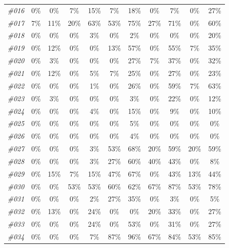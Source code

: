 \begin{table}[t]
\begin{tabular}{ccccccccccc}
    \textit{\#016} & 0\%   & 0\%   & 7\%   & 15\%  & 7\%   & 18\%  & 0\%   & 7\%   & 0\%   & 27\% \\
    \textit{\#017} & 7\%   & 11\%  & 20\%  & 63\%  & 53\%  & 75\%  & 27\%  & 71\%  & 0\%   & 60\% \\
    \textit{\#018} & 0\%   & 0\%   & 0\%   & 3\%   & 0\%   & 2\%   & 0\%   & 0\%   & 0\%   & 20\% \\
    \textit{\#019} & 0\%   & 12\%  & 0\%   & 0\%   & 13\%  & 57\%  & 0\%   & 55\%  & 7\%   & 35\% \\
    \textit{\#020} & 0\%   & 3\%   & 0\%   & 0\%   & 0\%   & 27\%  & 7\%   & 37\%  & 0\%   & 32\% \\
    \textit{\#021} & 0\%   & 12\%  & 0\%   & 5\%   & 7\%   & 25\%  & 0\%   & 27\%  & 0\%   & 23\% \\
    \textit{\#022} & 0\%   & 0\%   & 0\%   & 1\%   & 0\%   & 26\%  & 0\%   & 59\%  & 7\%   & 63\% \\
    \textit{\#023} & 0\%   & 3\%   & 0\%   & 0\%   & 0\%   & 3\%   & 0\%   & 22\%  & 0\%   & 12\% \\
    \textit{\#024} & 0\%   & 0\%   & 0\%   & 4\%   & 0\%   & 15\%  & 0\%   & 9\%   & 0\%   & 10\% \\
    \textit{\#025} & 0\%   & 0\%   & 0\%   & 0\%   & 0\%   & 5\%   & 0\%   & 0\%   & 0\%   & 0\% \\
    \textit{\#026} & 0\%   & 0\%   & 0\%   & 0\%   & 0\%   & 4\%   & 0\%   & 0\%   & 0\%   & 0\% \\
    \textit{\#027} & 0\%   & 0\%   & 0\%   & 3\%   & 53\%  & 68\%  & 20\%  & 59\%  & 20\%  & 59\% \\
    \textit{\#028} & 0\%   & 0\%   & 0\%   & 3\%   & 27\%  & 60\%  & 40\%  & 43\%  & 0\%   & 8\% \\
    \textit{\#029} & 0\%   & 15\%  & 7\%   & 15\%  & 47\%  & 67\%  & 0\%   & 43\%  & 13\%  & 44\% \\
    \textit{\#030} & 0\%   & 0\%   & 53\%  & 53\%  & 60\%  & 62\%  & 67\%  & 87\%  & 53\%  & 78\% \\
    \textit{\#031} & 0\%   & 0\%   & 0\%   & 2\%   & 27\%  & 35\%  & 0\%   & 3\%   & 0\%   & 5\% \\
    \textit{\#032} & 0\%   & 13\%  & 0\%   & 24\%  & 0\%   & 0\%   & 20\%  & 33\%  & 0\%   & 27\% \\
    \textit{\#033} & 0\%   & 0\%   & 0\%   & 24\%  & 0\%   & 53\%  & 0\%   & 31\%  & 0\%   & 27\% \\
    \textit{\#034} & 0\%   & 0\%   & 0\%   & 7\%   & 87\%  & 96\%  & 67\%  & 84\%  & 53\%  & 85\% \\

\end{tabular}
\end{table}
